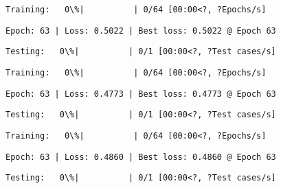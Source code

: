 \documentclass[11pt]{article}
\begin{document}
    
    
    \begin{Verbatim}[commandchars=\\\{\}]
Training:   0\%|          | 0/64 [00:00<?, ?Epochs/s]
    \end{Verbatim}

    
    \begin{Verbatim}[commandchars=\\\{\}]
Epoch: 63 | Loss: 0.5022 | Best loss: 0.5022 @ Epoch 63
    \end{Verbatim}

    
    \begin{Verbatim}[commandchars=\\\{\}]
Testing:   0\%|          | 0/1 [00:00<?, ?Test cases/s]
    \end{Verbatim}

    
    
    \begin{Verbatim}[commandchars=\\\{\}]
Training:   0\%|          | 0/64 [00:00<?, ?Epochs/s]
    \end{Verbatim}

    
    \begin{Verbatim}[commandchars=\\\{\}]
Epoch: 63 | Loss: 0.4773 | Best loss: 0.4773 @ Epoch 63
    \end{Verbatim}

    
    \begin{Verbatim}[commandchars=\\\{\}]
Testing:   0\%|          | 0/1 [00:00<?, ?Test cases/s]
    \end{Verbatim}

    
    
    \begin{Verbatim}[commandchars=\\\{\}]
Training:   0\%|          | 0/64 [00:00<?, ?Epochs/s]
    \end{Verbatim}

    
    \begin{Verbatim}[commandchars=\\\{\}]
Epoch: 63 | Loss: 0.4860 | Best loss: 0.4860 @ Epoch 63
    \end{Verbatim}

    
    \begin{Verbatim}[commandchars=\\\{\}]
Testing:   0\%|          | 0/1 [00:00<?, ?Test cases/s]
    \end{Verbatim}
\end{document}
